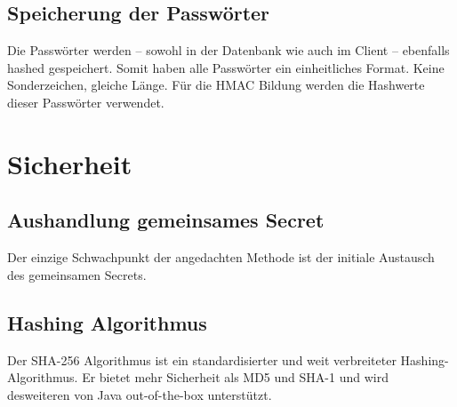 \documentclass[10pt,a4paper]{scrartcl}
\begin{document}
\subsection{Speicherung der Passwörter}
Die Passwörter werden -- sowohl in der Datenbank wie auch im Client -- ebenfalls hashed
gespeichert. Somit haben alle Passwörter ein einheitliches Format. Keine Sonderzeichen, gleiche
Länge. Für die HMAC Bildung werden die Hashwerte dieser Passwörter verwendet.


\section{Sicherheit}

\subsection{Aushandlung gemeinsames Secret}
Der einzige Schwachpunkt der angedachten Methode ist der initiale Austausch des gemeinsamen Secrets.

\subsection{Hashing Algorithmus}
Der SHA-256 Algorithmus ist ein standardisierter und weit verbreiteter Hashing-Algorithmus. Er
bietet mehr Sicherheit als MD5 und SHA-1 und wird desweiteren von Java out-of-the-box unterstützt.
\end{document}
